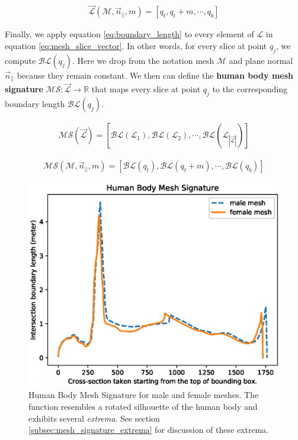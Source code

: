 \documentclass[runningheads, orivec]{llncs}
\begin{document}
\begin{align}\label{eq:mesh_slice_vector}
\vec{\mathcal{L}}(\mathcal{M}, \vec{n}_{||}, m) = \left[ q_t, q_t+m, \cdots, 
q_b \right]
\end{align}

Finally, we apply equation \ref{eq:boundary_length} to every element of 
$\mathcal{L}$ in equation \ref{eq:mesh_slice_vector}. In other words, for every 
slice at point 
$q_j$, we compute $\mathcal{BL}(q_j)$. Here we drop from the notation mesh 
$\mathcal{M}$ and plane normal $\vec{n}_{||}$ because they remain constant. We 
then can 
define the \textbf{human body mesh signature} $\mathcal{MS}: 
\vec{\mathcal{L}} \to \mathbb{R}$ that maps every slice at point $q_j$ to the 
corresponding boundary length $\mathcal{BL}(q_j)$.

\begin{align}\label{eq:mesh_signature_short}
\mathcal{MS}(\vec{\mathcal{L}}) = [\mathcal{BL}(\mathcal{L}_1), 
\mathcal{BL}(\mathcal{L}_2), \cdots, 
\mathcal{BL}(\mathcal{L}_{|\vec{\mathcal{L}}|})]
\end{align}

\begin{align}\label{eq:mesh_signature}
\mathcal{MS}(\mathcal{M}, \vec{n}_{||}, m) = 
[\mathcal{BL}(q_t), \mathcal{BL}(q_t+m), \cdots, \mathcal{BL}(q_b)]
\end{align}

\begin{figure}[H]
	\begin{center}
		\includegraphics[width=\linewidth]{Figure_1.eps}
	\end{center}
	\caption{Human Body Mesh Signature for male and female meshes. The 
		function resembles a rotated silhouette of the human body and exhibits 
		several \textit{extrema}. See section 
		\ref{subsec:mesh_signature_extrema} for discussion of these extrema.}
	\label{fig:hbm_signature}
\end{figure}
\end{document}
